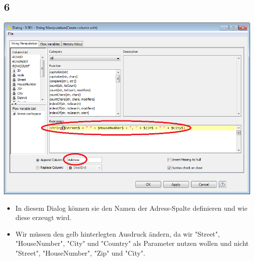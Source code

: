 \documentclass{beamer}
\begin{document}
\subsection{6}
\begin{frame}
	\begin{center}
  		\includegraphics[height=0.6\textheight]{6.png}
	\end{center}
	\begin{itemize}
		\item In diesem Dialog können sie den Namen der Adress-Spalte definieren und wie diese erzeugt wird.
		\item Wir müssen den gelb hinterlegten Ausdruck ändern, da wir "Street", "HouseNumber", "City" und "Country" als Parameter nutzen wollen und nicht "Street", "HouseNumber", "Zip" und "City".
	\end{itemize}
\end{frame}
\end{document}

